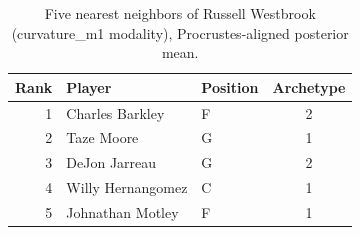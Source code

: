 \begin{table}[htbp]
  \centering\small
  \begin{tabular}{rllc}
    \toprule
    Rank & Player & Position & Archetype \\
    \midrule
    1 & Charles Barkley & F & 2 \\
    2 & Taze Moore & G & 1 \\
    3 & DeJon Jarreau & G & 2 \\
    4 & Willy Hernangomez & C & 1 \\
    5 & Johnathan Motley & F & 1 \\
    \bottomrule
  \end{tabular}
  \caption{Five nearest neighbors of Russell Westbrook (curvature_m1 modality), Procrustes-aligned posterior mean.}
  \label{tab:Russell_Westbrook_neighbors_curvature_m1}
\end{table}

